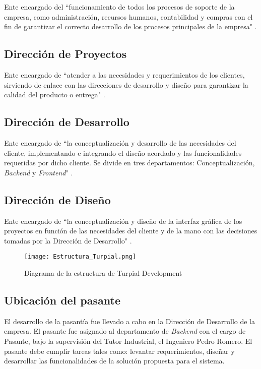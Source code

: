 Ente encargado del “funcionamiento de todos los procesos de soporte de la empresa, como administración, recursos humanos, contabilidad y compras con el fin de garantizar el correcto desarrollo de los procesos principales de la empresa" \cite{manualTurpial}.

\subsection*{Dirección de Proyectos}

Ente encargado de “atender a las necesidades y requerimientos de los clientes, sirviendo de enlace con las direcciones de desarrollo y diseño para garantizar la calidad del producto o entrega" \cite{manualTurpial}.

\subsection*{Dirección de Desarrollo}

Ente encargado de “la conceptualización y desarrollo de las necesidades del cliente, implementando e integrando el diseño acordado y las funcionalidades requeridas por dicho cliente. Se divide en tres departamentos: Conceptualización, \textit{Backend} y \textit{Frontend}" \cite{manualTurpial}.

\subsection*{Dirección de Diseño}

Ente encargado de “la conceptualización y diseño de la interfaz gráfica de los proyectos en función de las necesidades del cliente y de la mano con las decisiones tomadas por la Dirección de Desarrollo" \cite{manualTurpial}.

\begin{figure}[h]
\centering
\texttt{[image: Estructura\_Turpial.png]}
\caption{Diagrama de la estructura de Turpial Development}
\label{fig:figura1.1}
\end{figure}

\subsection*{Ubicación del pasante}

El desarrollo de la pasantía fue llevado a cabo en la Dirección de Desarrollo de la empresa. El pasante fue asignado al departamento de \textit{Backend} con el cargo de Pasante, bajo la supervisión del Tutor Industrial, el Ingeniero Pedro Romero. El pasante debe cumplir tareas tales como: levantar requerimientos, diseñar y desarrollar las funcionalidades de la solución propuesta para el sistema.
